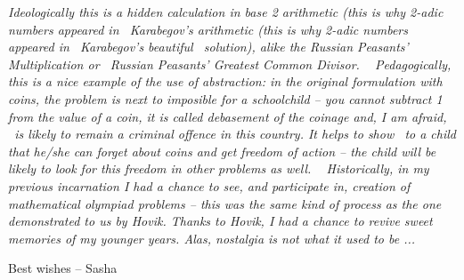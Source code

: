 {\sl Ideologically this is a hidden calculation in base 2
arithmetic (this
is why 2-adic numbers appeared  in  Karabegov's
arithmetic (this
is why 2-adic numbers appeared in  Karabegov's
 beautiful  solution),
alike the Russian Peasants' Multiplication or  Russian
Peasants'
Greatest Common Divisor.
 
 Pedagogically, this is a nice example of the use of
 abstraction: in
 the original formulation with coins, the problem is next
 to imposible
 for a schoolchild -- you cannot subtract 1 from the value
 of a coin,
 it is called debasement of the coinage and, I am afraid,
 is likely to
 remain a criminal offence in this country. It helps to
 show  to a
 child that he/she can forget about coins 
 and get freedom of action --
 the child will be likely to look for this freedom in other
 problems as well.
 
  Historically, in my previous incarnation I had a chance to
see, and
participate in, creation of mathematical olympiad problems
-- this was
the same kind of process as the one demonstrated to us by
Hovik. Thanks to Hovik, I had a chance to revive sweet memories
of my younger
years.
Alas, nostalgia is not what it used to be ...
 

}


Best wishes -- Sasha
\bye
